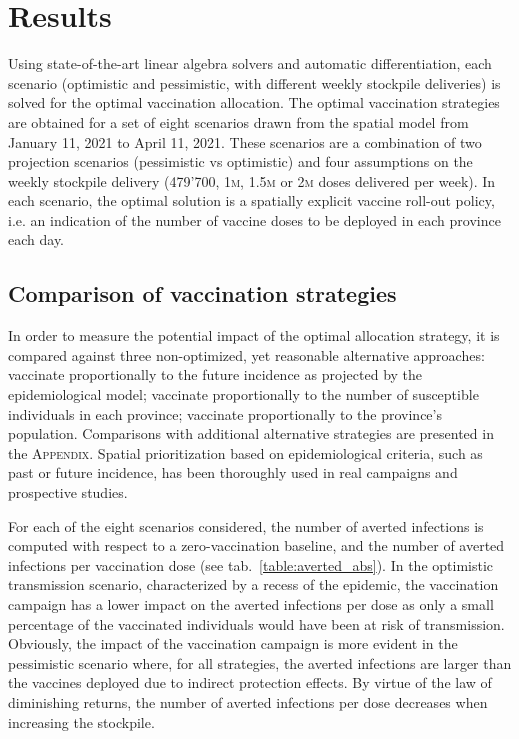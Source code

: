 \section{Results}
Using state-of-the-art linear algebra solvers and automatic differentiation, each scenario (optimistic and pessimistic, with different weekly stockpile deliveries) is solved for the optimal vaccination allocation. The optimal vaccination strategies are obtained for a set of eight scenarios drawn from the spatial model from January 11, 2021 to April 11, 2021. These scenarios are a combination of two projection scenarios (pessimistic vs optimistic) and four assumptions on the weekly stockpile delivery (479'700, 1\textsc{m}, 1.5\textsc{m} or 2\textsc{m} doses delivered per week). In each scenario, the optimal solution is a spatially explicit vaccine roll-out policy, i.e. an indication of the number of vaccine doses to be deployed in each province each day. 
\subsection*{Comparison of vaccination strategies}
In order to measure the potential impact of the optimal allocation strategy, it is compared against three non-optimized, yet reasonable alternative approaches: vaccinate proportionally to the future incidence as projected by the epidemiological model; vaccinate proportionally to the number of susceptible individuals in each province; vaccinate proportionally to the province's population. 
Comparisons with additional alternative strategies are presented in the \textsc{Appendix}. Spatial prioritization based on epidemiological criteria, such as past\cite{Lee:AchievingCoordinatedNational:2020} or future\cite{Pasetto:RealtimeForecastingCholera:2018} incidence, has been thoroughly used in real campaigns and prospective studies.

For each of the eight scenarios considered, the number of averted infections is computed with respect to a zero-vaccination baseline, and the number of averted infections per vaccination dose (see tab.~\ref{table:averted_abs}). In the optimistic transmission scenario, characterized by a recess of the epidemic, the vaccination campaign has a lower impact on the averted infections per dose as only a small percentage of the vaccinated individuals would have been at risk of transmission. Obviously, the impact of the vaccination campaign is more evident in the pessimistic scenario where, for all strategies, the averted infections are larger than the vaccines deployed due to indirect protection effects. By virtue of the law of diminishing returns, the number of averted infections per dose decreases when increasing the stockpile. 

